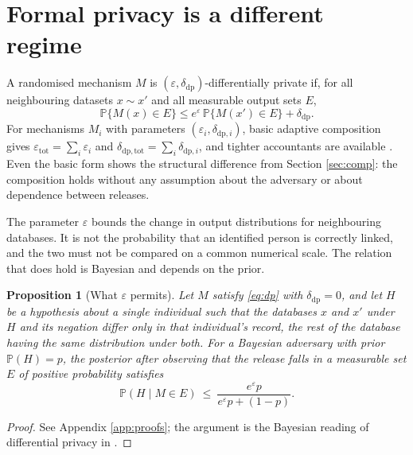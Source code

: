 \documentclass[11pt,a4paper]{article}
\theoremstyle{plain}
\newtheorem{proposition}{Proposition}
\theoremstyle{definition}
\newcommand{\Prob}{\mathbb{P}}
\begin{document}
\section{Formal privacy is a different regime}\label{sec:dp}

A randomised mechanism $M$ is $(\varepsilon, \delta_{\mathrm{dp}})$-differentially
private if, for all neighbouring datasets $x \sim x'$ and all measurable output
sets $E$,
\begin{equation}
\Prob\{M(x) \in E\} \leq e^{\varepsilon}\,\Prob\{M(x') \in E\}
+ \delta_{\mathrm{dp}} .
\label{eq:dp}
\end{equation}
For mechanisms $M_i$ with parameters $(\varepsilon_i, \delta_{\mathrm{dp},i})$,
basic adaptive composition gives $\varepsilon_{\mathrm{tot}} = \sum_i
\varepsilon_i$ and $\delta_{\mathrm{dp,tot}} = \sum_i \delta_{\mathrm{dp},i}$, and tighter accountants are
available \citep{dwork2010,kairouz2017,bun2016,mironov2017,dong2022}. Even the basic form shows the
structural difference from Section \ref{sec:comp}: the composition holds without
any assumption about the adversary or about dependence between releases.

The parameter $\varepsilon$ bounds the change in output distributions for
neighbouring databases. It is not the probability that an identified person is
correctly linked, and the two must not be compared on a common numerical scale.
The relation that does hold is Bayesian and depends on the prior.

\begin{proposition}[What $\varepsilon$ permits]\label{prop:dpbound}
Let $M$ satisfy \eqref{eq:dp} with $\delta_{\mathrm{dp}} = 0$, and let $H$ be a
hypothesis about a single individual such that the databases $x$ and $x'$ under
$H$ and its negation differ only in that individual's record, the rest of the
database having the same distribution under both.
For a Bayesian adversary with prior $\Prob(H) = p$, the posterior after
observing that the release falls in a measurable set $E$ of positive
probability satisfies
\begin{equation}
\Prob(H \mid M \in E) \ \leq \
\frac{e^{\varepsilon} p}{e^{\varepsilon} p + (1 - p)} .
\label{eq:dppost}
\end{equation}
\end{proposition}

\begin{proof}
See Appendix \ref{app:proofs}; the argument is the Bayesian reading of
differential privacy in \citet{kasiviswanathan2014}.
\end{proof}
\end{document}
